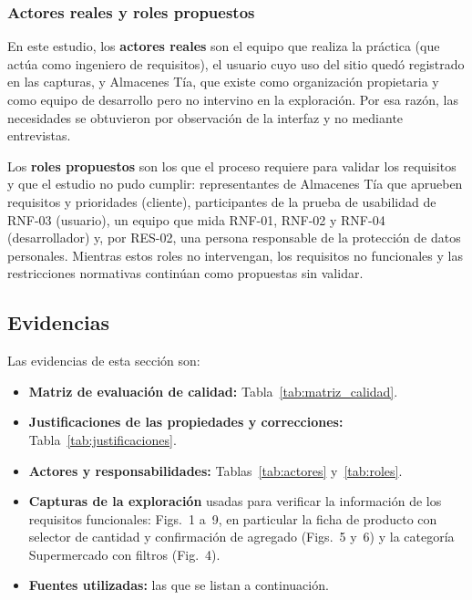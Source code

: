 \documentclass[11pt,a4paper]{article}
\begin{document}
\subsubsection{Actores reales y roles propuestos}

En este estudio, los \textbf{actores reales} son el equipo que
realiza la práctica (que actúa como ingeniero de requisitos), el
usuario cuyo uso del sitio quedó registrado en las capturas, y
Almacenes Tía, que existe como organización propietaria y como
equipo de desarrollo pero no intervino en la exploración. Por
esa razón, las necesidades se obtuvieron por observación de la
interfaz y no mediante entrevistas.

Los \textbf{roles propuestos} son los que el proceso requiere para
validar los requisitos y que el estudio no pudo cumplir:
representantes de Almacenes Tía que aprueben requisitos y
prioridades (cliente), participantes de la prueba de usabilidad
de RNF-03 (usuario), un equipo que mida RNF-01, RNF-02 y RNF-04
(desarrollador) y, por RES-02, una persona responsable de la
protección de datos personales. Mientras estos roles no
intervengan, los requisitos no funcionales y las restricciones
normativas continúan como propuestas sin validar.

\subsection{Evidencias}

Las evidencias de esta sección son:

\begin{itemize}
    \item \textbf{Matriz de evaluación de calidad:}
    Tabla~\ref{tab:matriz_calidad}.
    \item \textbf{Justificaciones de las propiedades y correcciones:}
    Tabla~\ref{tab:justificaciones}.
    \item \textbf{Actores y responsabilidades:}
    Tablas~\ref{tab:actores} y~\ref{tab:roles}.
    \item \textbf{Capturas de la exploración} usadas para verificar
    la información de los requisitos funcionales:
    Figs.~1 a~9, en particular la ficha de
    producto con selector de cantidad y confirmación de agregado
    (Figs.~5 y~6) y la categoría Supermercado
    con filtros (Fig.~4).
    \item \textbf{Fuentes utilizadas:} las que se listan a continuación.
\end{itemize}
\end{document}
